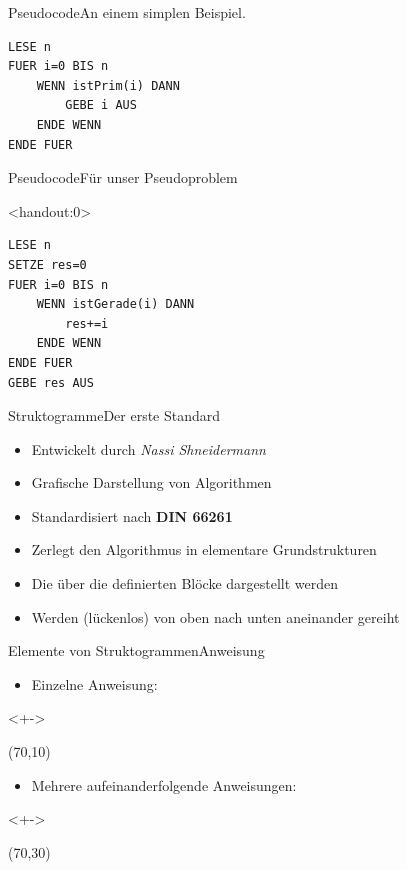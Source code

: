 \begin{frame}[fragile]{Pseudocode}{An einem simplen Beispiel.}
\lstset{style=pseudo}
\begin{lstlisting}
LESE n
FUER i=0 BIS n
    WENN istPrim(i) DANN
        GEBE i AUS
    ENDE WENN
ENDE FUER
\end{lstlisting}
\end{frame}

\begin{frame}[fragile]{Pseudocode}{Für unser Pseudoproblem}
\lstset{style=pseudo}
\begin{onlyenv}<handout:0>
\begin{lstlisting}
LESE n
SETZE res=0
FUER i=0 BIS n
    WENN istGerade(i) DANN
        res+=i
    ENDE WENN
ENDE FUER
GEBE res AUS
\end{lstlisting}
\end{onlyenv}
\end{frame}

\begin{frame}{Struktogramme}{Der erste Standard}
    \begin{itemize}
        \item Entwickelt durch \textit{Nassi Shneidermann}
        \item Grafische Darstellung von Algorithmen
        \item Standardisiert nach \textbf{DIN 66261}
        \item Zerlegt den Algorithmus in elementare Grundstrukturen
        \item Die über die definierten Blöcke dargestellt werden
        \item Werden (lückenlos) von oben nach unten aneinander gereiht
    \end{itemize}
\end{frame}

\begin{frame}{Elemente von Struktogrammen}{Anweisung}
\begin{itemize}
    \item <+->Einzelne Anweisung:
\end{itemize}
\begin{onlyenv}<+->
\begin{centernss}
    \begin{struktogramm}(70,10)
    \end{struktogramm}
\end{centernss}
\end{onlyenv}

\begin{itemize}
    \item <+-> Mehrere aufeinanderfolgende Anweisungen:
\end{itemize}
\begin{onlyenv}<+->
\begin{centernss}
    \begin{struktogramm}(70,30)
    \end{struktogramm}
\end{centernss}
\end{onlyenv}
\end{frame}

